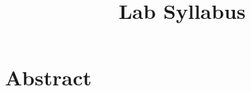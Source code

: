 \documentclass[12pt]{article}
\begin{document}
\title{\vspace{-.35in}Lab Syllabus}
\date{\empty}
\maketitle

\pagestyle{fancy}
\thispagestyle{fancy}

\vspace{-.75in}
\section{Abstract}
\end{document}
